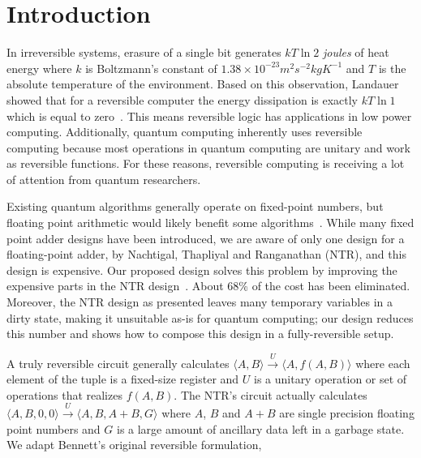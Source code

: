 \documentclass[%
reprint,
 amsmath,amssymb,
 aps,
]{revtex4-1}
\begin{document}

\maketitle %




\section{Introduction}


In irreversible systems, erasure of a single bit generates $kT\ln2$ \emph{joules} of heat energy where $k$ is Boltzmann's constant of $1.38\times10^{-23}m^{2}s^{-2}kgK^{-1}$ and $T$ is the absolute temperature of the environment. Based on this observation, Landauer showed that for a reversible computer the energy dissipation is exactly $kT\ln1$ which is equal to zero~\cite{heat}. This means reversible logic has applications in low power computing. Additionally, quantum computing inherently uses reversible computing because most operations in quantum computing are unitary and work as reversible functions. For these reasons, reversible computing is receiving a lot of attention from quantum researchers. 
\par Existing quantum algorithms generally operate on fixed-point numbers, but floating point arithmetic would likely benefit some algorithms~\cite{harrow:lineqs,clader2013quantum,jordan12:qa-qft}. While many fixed point adder designs have been introduced, we are aware of only one design for a floating-point adder, by Nachtigal, Thapliyal and Ranganathan (NTR), and this design is expensive. Our proposed design solves this problem by improving the expensive parts in the NTR design~\cite{nachtigal}. About 68\% of the cost has been eliminated. Moreover, the NTR design as presented leaves many temporary variables in a dirty state, making it unsuitable as-is for quantum computing; our design reduces this number and shows how to compose this design in a fully-reversible setup.
\par A truly reversible circuit generally calculates $ \langle A,B \rangle \xrightarrow{U} \langle A,f(A,B) \rangle $
 where each element of the tuple is a fixed-size register and $U$ is a unitary operation or set of operations that realizes $f(A,B)$. The NTR's circuit actually calculates $ \langle A,B,0,0 \rangle \xrightarrow{U} \langle A,B,A+B,G \rangle$ where $A$, $B$ and $A+B$ are single precision floating point numbers and $G$ is a large amount of ancillary data left in a garbage state. We adapt Bennett's original reversible formulation,
\end{document}
